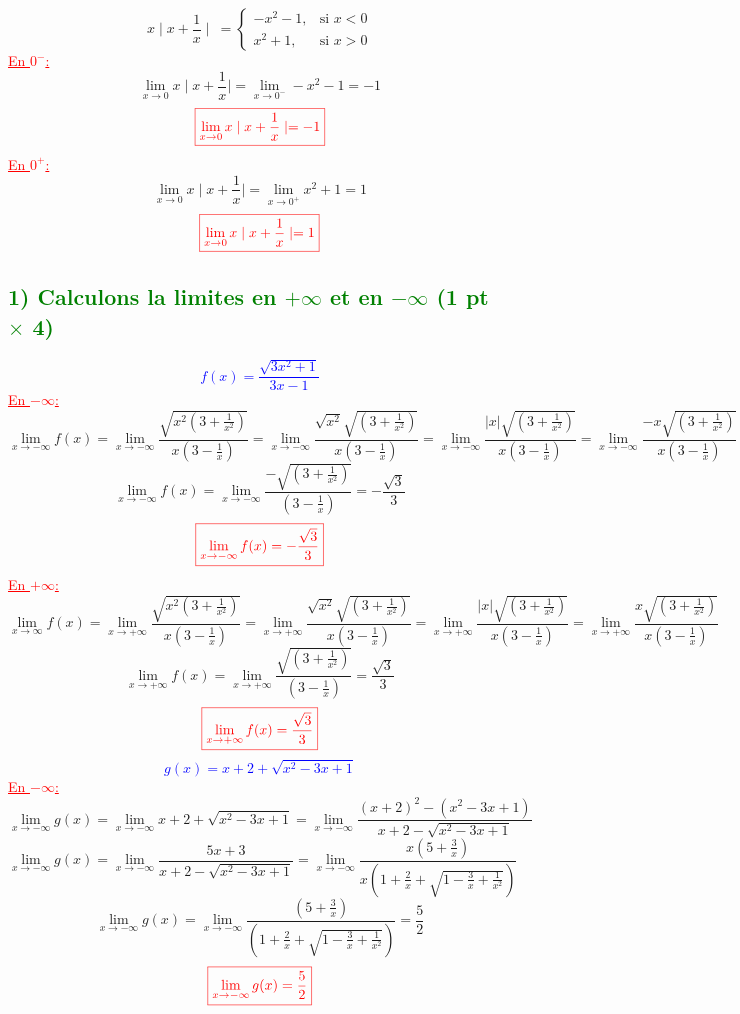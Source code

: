 \documentclass{article}
\begin{document}
\[ x\mid x+\frac{1}{x}\mid\ = \begin{cases} 
  -x^{2}-1, & \text{si } x < 0 \\
  x^{2}+1, & \text{si } x > 0
\end{cases} \]
\textcolor{red}{\underline{En $0^{-}$:}}
\[\lim_{x \to 0}x\mid x+\frac{1}{x}\mid=\lim_{x \to 0^{-}}-x^{2}-1=-1\]
\[\textcolor{red}{\boxed{\lim_{x \to 0}x\mid x+\frac{1}{x}\mid=-1}}\]
\textcolor{red}{\underline{En $0^{+}$:}}
\[\lim_{x \to 0}x\mid x+\frac{1}{x}\mid=\lim_{x \to 0^{+}}x^{2}+1=1\]
\[\textcolor{red}{\boxed{\lim_{x \to 0}x\mid x+\frac{1}{x}\mid=1}}\]
\subsection*{\textcolor{green}{1) Calculons la limites en $+\infty$ et en $-\infty$ (1 pt $\times$ 4)}}
\textcolor{blue}{\[ f(x)=\frac{\sqrt{3x^{2}+1}}{3x-1}\]} 
\textcolor{red}{\underline{En $-\infty$:}}
\[\lim_{x \to -\infty}f(x)=\lim_{x \to -\infty}\frac{\sqrt{x^{2}(3+\frac{1}{x^{2}})}}{x(3-\frac{1}{x})}=\lim_{x \to -\infty}\frac{\sqrt{x^{2}}\sqrt{(3+\frac{1}{x^{2}})}}{x(3-\frac{1}{x})}=\lim_{x \to -\infty}\frac{|x|\sqrt{(3+\frac{1}{x^{2}})}}{x(3-\frac{1}{x})}=\lim_{x \to -\infty}\frac{-x\sqrt{(3+\frac{1}{x^{2}})}}{x(3-\frac{1}{x})}\]
\[\lim_{x \to -\infty}f(x)=\lim_{x \to -\infty}\frac{-\sqrt{(3+\frac{1}{x^{2}})}}{(3-\frac{1}{x})}=-\frac{\sqrt{3}}{3}\]
\[\textcolor{red}{\boxed{\lim_{x \to -\infty}f(x)=-\frac{\sqrt{3}}{3}}}\]
\textcolor{red}{\underline{En $+\infty$:}}
\[\lim_{x \to \infty}f(x)=\lim_{x \to +\infty}\frac{\sqrt{x^{2}(3+\frac{1}{x^{2}})}}{x(3-\frac{1}{x})}=\lim_{x \to +\infty}\frac{\sqrt{x^{2}}\sqrt{(3+\frac{1}{x^{2}})}}{x(3-\frac{1}{x})}=\lim_{x \to +\infty}\frac{|x|\sqrt{(3+\frac{1}{x^{2}})}}{x(3-\frac{1}{x})}=\lim_{x \to +\infty}\frac{x\sqrt{(3+\frac{1}{x^{2}})}}{x(3-\frac{1}{x})}\]
\[\lim_{x \to +\infty}f(x)=\lim_{x \to +\infty}\frac{\sqrt{\left( 3+\frac{1}{x^{2}}\right) }}{\left( 3-\frac{1}{x}\right)}=\frac{\sqrt{3}}{3}\]
\[\textcolor{red}{\boxed{\lim_{x \to +\infty}f(x)=\frac{\sqrt{3}}{3}}}\]
\textcolor{blue}{\[g(x)=x+2+\sqrt{x^{2}-3x+1}\]}
\textcolor{red}{\underline{En $-\infty$:}}
\[\lim_{x \to -\infty}g(x)=\lim_{x \to -\infty}x+2+\sqrt{x^{2}-3x+1}=\lim_{x \to -\infty}\frac{(x+2)^{2}-(x^{2}-3x+1)}{x+2-\sqrt{x^{2}-3x+1}}\]
\[\lim_{x \to -\infty}g(x)=\lim_{x \to -\infty}\frac{5x+3}{x+2-\sqrt{x^{2}-3x+1}}=\lim_{x \to -\infty}\frac{x(5+\frac{3}{x})}{x\left(1+\frac{2}{x}+\sqrt{1-\frac{3}{x}+\frac{1}{x^{2}}}\right)}\]
\[\lim_{x \to -\infty}g(x)=\lim_{x \to -\infty}\frac{(5+\frac{3}{x})}{\left(1+\frac{2}{x}+\sqrt{1-\frac{3}{x}+\frac{1}{x^{2}}}\right)}=\frac{5}{2}\]
\[\textcolor{red}{\boxed{\lim_{x \to -\infty}g(x)=\frac{5}{2}}}\]
\end{document}

